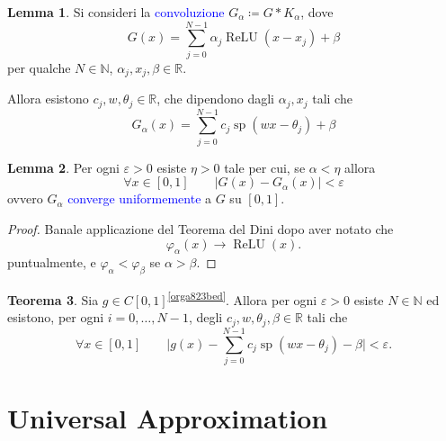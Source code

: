 \documentclass[10pt]{book}
\newcommand{\1}{\mathds{1}}
\newcommand{\R}{\mathds{R}}
\newcommand{\N}{\mathds{N}}
\newcommand{\conv}{\mathbin{*}}
\theoremstyle{definition}%
\newtheorem{thm}{Teorema}[section]
\newtheorem{lem}[thm]{Lemma}
\theoremstyle{plain}
\theoremstyle{remark}
\renewcommand{\href}[2]{\textcolor{blue}{#2}}
\begin{document}
\begin{lem}
Si consideri la \href{../../../../../org/roam/20250703105424-prodotto_di_convoluzione.org}{convoluzione} \(G_{\alpha}\coloneqq G\conv K_{\alpha}\), dove
\begin{equation*}
G(x) = \sum_{j=0}^{N-1} \alpha_{j} \operatorname{ReLU}(x-x_{j})+\beta
\end{equation*}
per qualche \(N \in \N\), \(\alpha_{j}, x_{j}, \beta \in \R\).

Allora esistono \(c_{j}, w, \theta_{j} \in \R\), che dipendono dagli \(\alpha_{j}, x_{j}\) tali che
\begin{equation*}
G_{\alpha}(x) = \sum_{j=0}^{N-1}c_{j}\operatorname{sp}(wx-\theta_{j}) + \beta
\end{equation*}
\end{lem}

\begin{lem}
Per ogni \(\varepsilon>0\) esiste \(\eta>0\) tale per cui, se \(\alpha<\eta\) allora
\begin{equation*}
\forall x \in [0,1]\qquad |G(x)-G_{\alpha}(x)|<\varepsilon
\end{equation*}
ovvero \(G_{\alpha}\) \href{../../../../../org/roam/20250629105745-convergenza_uniforme.org}{converge uniformemente} a \(G\) su \([0,1]\).
\end{lem}

\begin{proof}
Banale applicazione del Teorema del Dini dopo aver notato che
\begin{equation*}
\varphi_{\alpha}(x)\to \operatorname{ReLU}(x).
\end{equation*}
puntualmente, e \(\varphi_{\alpha}<\varphi_{\beta}\) se \(\alpha>\beta\).
\end{proof}

\begin{thm}
Sia \(g \in C[0,1]\)\textsuperscript{\ref{orga823bed}}. Allora per ogni \(\varepsilon>0\) esiste \(N \in \N\) ed esistono, per ogni \(i=0,\dots,N-1\), degli \(c_{j},w,\theta_{j},\beta \in \R\) tali che
\begin{equation*}
\forall x \in [0,1]\qquad \bigg\lvert g(x)-\sum_{j=0}^{N-1}c_{j}\operatorname{sp}(wx-\theta_{j})-\beta\bigg\rvert<\varepsilon.
\end{equation*}
\end{thm}
\chapter{Universal Approximation}
\label{sec:orgb0ce816}
\end{document}
